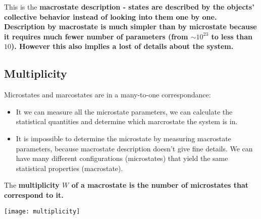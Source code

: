 \documentclass[class=article, crop=false, 12pt]{standalone}
\begin{document}
This is the \bf{macrostate description} - 
states are described by the objects' collective behavior instead of looking into them one by one. 
Description by macrostate is much simpler than by microstate because it requires much fewer number of parameters 
(from $\sim 10^{23}$ to less than $10$). 
However this also implies a lost of details about the system.



\subsection{Multiplicity}

Microstates and marcostates are in a many-to-one correspondance:

\begin{itemize}
    \item It we can measure all the microstate parameters, 
    we can calculate the statistical quantities and determine which marcrostate the system is in.

    \item It is impossible to determine the microstate by measuring macrostate parameters, 
    because macrostate description doesn't give fine details. 
    We can have many different configurations (microstates) that yield the same statistical properties (macrostate). 

\end{itemize}

The \bf{multiplicity $W$ of a macrostate} is the number of microstates that correspond to it. 

\begin{center}
    \begin{minipage}{0.7\linewidth}
        \centering
        \texttt{[image: multiplicity]}
    \end{minipage}
\end{center}
\end{document}
